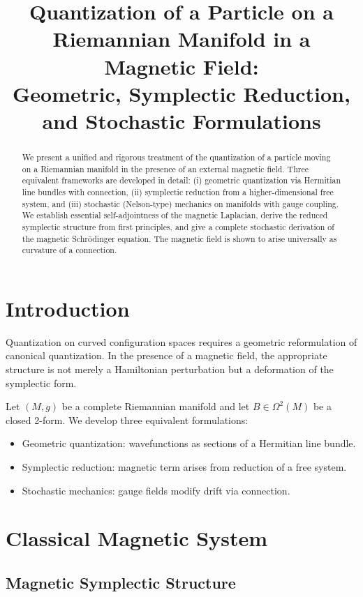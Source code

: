\documentclass[11pt]{article}
\title{\textbf{Quantization of a Particle on a Riemannian Manifold in a Magnetic Field:\\
Geometric, Symplectic Reduction, and Stochastic Formulations}}
\author{}
\date{}
\begin{document}
\maketitle

\begin{abstract}
We present a unified and rigorous treatment of the quantization of a particle moving on a Riemannian manifold in the presence of an external magnetic field. Three equivalent frameworks are developed in detail: (i) geometric quantization via Hermitian line bundles with connection, (ii) symplectic reduction from a higher-dimensional free system, and (iii) stochastic (Nelson-type) mechanics on manifolds with gauge coupling. We establish essential self-adjointness of the magnetic Laplacian, derive the reduced symplectic structure from first principles, and give a complete stochastic derivation of the magnetic Schr\"odinger equation. The magnetic field is shown to arise universally as curvature of a connection.
\end{abstract}

\section{Introduction}

Quantization on curved configuration spaces requires a geometric reformulation of canonical quantization. In the presence of a magnetic field, the appropriate structure is not merely a Hamiltonian perturbation but a deformation of the symplectic form.

Let $(M,g)$ be a complete Riemannian manifold and let $B \in \Omega^2(M)$ be a closed 2-form. We develop three equivalent formulations:
\begin{itemize}
\item Geometric quantization: wavefunctions as sections of a Hermitian line bundle.
\item Symplectic reduction: magnetic term arises from reduction of a free system.
\item Stochastic mechanics: gauge fields modify drift via connection.
\end{itemize}

\section{Classical Magnetic System}

\subsection{Magnetic Symplectic Structure}
\end{document}
